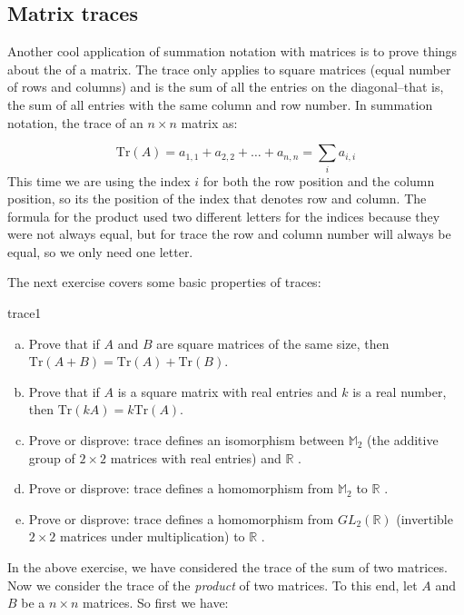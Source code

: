 \subsection{Matrix traces}
Another cool application of summation notation with matrices is to prove things about the  of a matrix.  The trace only applies to square matrices (equal number of rows and columns) and is the sum of all the entries on the diagonal--that is,  the sum of all entries with the same column and row number.  In summation notation, the trace of an $n \times n$ matrix as:

\[ \text{Tr} \left( A \right)= a_{1,1} + a_{2,2} + \ldots + a_{n,n} = \sum_{i} a_{i,i} \] 
This time we are using the index $i$ for both the row position and the column position, so its the position of the index that denotes row and column.  The formula for the product used two different letters for the indices because they were not always equal, but for trace the row and column number will always be equal, so we only need one letter.

The next exercise covers some basic properties of traces:

\begin{exercise}{trace1}
\begin{enumerate}[(a)]
\item
Prove that if $A$ and $B$ are square matrices of the same size, then $\text{Tr} \left( A + B \right) = \text{Tr} \left( A \right) + \text{Tr} \left( B \right)$.
\item
Prove that if $A$ is a square matrix with real entries and $k$ is a real number, then $\text{Tr} \left(k A  \right) = k\text{Tr} \left( A \right)$.
\item
Prove or disprove: trace defines an isomorphism between $\mathbb{M}_2$ (the additive group of $2 \times 2$ matrices with real entries) and $\mathbb{R}$ .
\item
Prove or disprove: trace defines a homomorphism from $\mathbb{M}_2$ to $\mathbb{R}$ .
\item
Prove or disprove: trace defines a homomorphism from $GL_2(\mathbb{R})$ (invertible $2 \times 2$ matrices under multiplication)  to $\mathbb{R}$ .
\end{enumerate}
\end{exercise}


In the above exercise, we have considered the trace of the sum of two matrices. Now we consider the trace of the \emph{product} of two matrices.  To this end, let ${A}$ and  ${B}$ be a $n \times n$ matrices.  So first we have:

